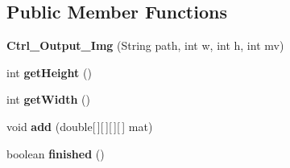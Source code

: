 \subsection*{Public Member Functions}
\begin{DoxyCompactItemize}
\item 
\mbox{\label{classpersistencia_1_1output_1_1Ctrl__Output__Img_aa3f2948dd4645d8b121eedf30daa0c3f}} 
{\bfseries Ctrl\+\_\+\+Output\+\_\+\+Img} (String path, int w, int h, int mv)
\item 
\mbox{\label{classpersistencia_1_1output_1_1Ctrl__Output__Img_aaf087f80fc9410ca6edbe2cbc424b502}} 
int {\bfseries get\+Height} ()
\item 
\mbox{\label{classpersistencia_1_1output_1_1Ctrl__Output__Img_a6efcf821f0a1097a7edd24c23e0da409}} 
int {\bfseries get\+Width} ()
\item 
\mbox{\label{classpersistencia_1_1output_1_1Ctrl__Output__Img_a305a977f4d4b999cf65e14e7106b6c5e}} 
void {\bfseries add} (double\mbox{[}$\,$\mbox{]}\mbox{[}$\,$\mbox{]}\mbox{[}$\,$\mbox{]}\mbox{[}$\,$\mbox{]} mat)
\item 
\mbox{\label{classpersistencia_1_1output_1_1Ctrl__Output__Img_af8fd6acb8727f25014cc5ecca9a216cf}} 
boolean {\bfseries finished} ()
\end{DoxyCompactItemize}
